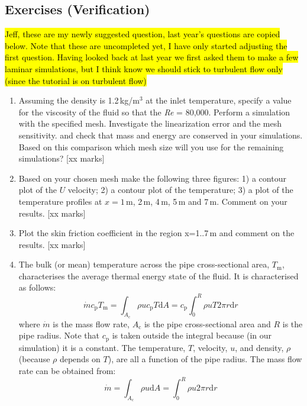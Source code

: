 \documentclass[11pt,a4paper,oneside]{scrartcl}
\newcommand\Rey{\mbox{\textit{Re}}\,\,}
\begin{document}
\subsection{Exercises (Verification)}
\hl{Jeff, these are my newly suggested question, last year's questions are copied below. Note that these are uncompleted yet, I have only started adjusting the first question. Having looked back at last year we first asked them to make a few laminar simulations, but I think know we should stick to turbulent flow only (since the tutorial is on turbulent flow)}
\begin{enumerate}
\item  Assuming the density is 1.2\,kg/m$^3$ at the inlet temperature, specify a value for the viscosity of the fluid so that the  \Rey= 80,000. Perform a simulation with the specified mesh. Investigate the linearization error and the mesh sensitivity. and check that mass and energy are conserved in your simulations. Based on this comparison which mesh size will you use for the remaining simulations? [xx marks]
\item Based on your chosen mesh make the following three figures: 1) a contour plot of the $U$ velocity; 2) a contour plot of the temperature; 3) a plot of the temperature profiles at $x=1\,$m, 2\,m, 4\,m, 5\,m and 7\,m. Comment on your results. [xx marks]
\item Plot the skin friction coefficient in the region x=1..7\,m and comment on the results.  [xx marks]
\item The bulk (or mean) temperature across the pipe cross-sectional area, $T_\mathrm{m}$, characterises the average thermal energy state of the fluid. It is characterised as follows:
\begin{equation}
    \dot{m}c_\mathrm{p}T_\mathrm{m}=\int_{A_\mathrm{c}}\rho uc_\mathrm{p} T\mathrm{d}A=c_\mathrm{p}\int_0^R\rho uT2\pi r \mathrm{d}r %
\end{equation}
    where $\dot{m}$ is the mass flow rate, $A_\mathrm{c}$ is the pipe cross-sectional area and $R$ is the pipe radius. Note that $c_\mathrm{p}$ is taken outside the integral because (in our simulation) it is a constant. The temperature, $T$, velocity, $u$, and density, $\rho$ (because $\rho$ depends on $T$), are all a function of the pipe radius. The mass flow rate can be obtained from:
    \begin{equation}
        \dot{m}=\int_{A_\mathrm{c}} \rho u \mathrm{d}A=\int_0^R\rho u 2\pi r \mathrm{d}r%

\end{equation}
\end{enumerate}
\end{document}
